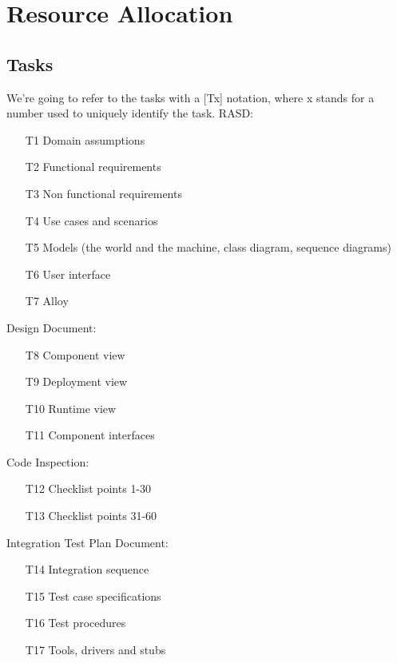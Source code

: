 \documentclass{article}
\begin{document}
\section{Resource Allocation}
\subsection{Tasks}
We're going to refer to the tasks with a [Tx] notation, where x stands for a number used to uniquely identify the task.
RASD:
\begin{itemize}
	\item [T1] Domain assumptions
	\item [T2] Functional requirements
	\item [T3] Non functional requirements
	\item [T4] Use cases and scenarios
	\item [T5] Models (the world and the machine, class diagram, sequence diagrams)
	\item [T6] User interface
	\item [T7] Alloy
\end{itemize}
Design Document:
\begin{itemize}
	\item [T8] Component view
	\item [T9] Deployment view
	\item [T10] Runtime view
	\item [T11] Component interfaces
\end{itemize}
Code Inspection:
\begin{itemize}
	\item [T12] Checklist points 1-30
	\item [T13] Checklist points 31-60
\end{itemize}
Integration Test Plan Document:
\begin{itemize}
	\item [T14] Integration sequence
	\item [T15] Test case specifications
	\item [T16] Test procedures
	\item [T17] Tools, drivers and stubs
\end{itemize}
\end{document}
